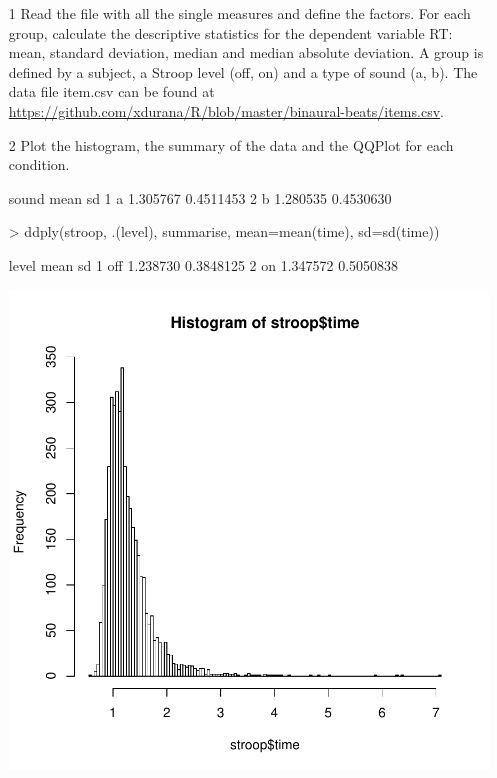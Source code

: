 \documentclass[12pt,a4paper]{article}
\begin{document}
\begin{itemize}

\item[1] Read the file with all the single measures and define the factors. For each group, calculate the descriptive statistics for the dependent variable RT: mean, standard deviation, median and median absolute deviation. A group is defined by a subject, a Stroop level (off, on) and a type of sound (a, b). The data file item.csv can be found at \url{https://github.com/xdurana/R/blob/master/binaural-beats/items.csv}.

\item[2] Plot the histogram, the summary of the data and the QQPlot for each condition.
\begin{Schunk}
\begin{Soutput}
  sound     mean        sd
1     a 1.305767 0.4511453
2     b 1.280535 0.4530630
\end{Soutput}
\begin{Sinput}
> ddply(stroop, .(level), summarise, mean=mean(time), sd=sd(time))
\end{Sinput}
\begin{Soutput}
  level     mean        sd
1   off 1.238730 0.3848125
2    on 1.347572 0.5050838
\end{Soutput}
\end{Schunk}
\includegraphics{report-002}

\end{itemize}
\end{document}
